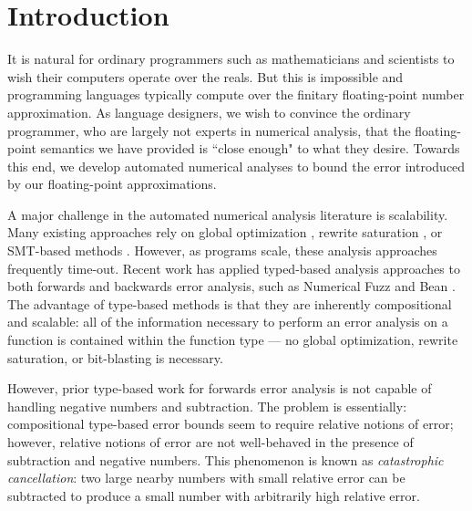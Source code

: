 \section{Introduction}
It is natural for ordinary programmers such as mathematicians and scientists to
wish their computers operate over the reals. 
But this is impossible and programming languages typically compute over the
finitary floating-point number approximation.
As language designers, we wish to convince the ordinary programmer, who are
largely not experts in numerical analysis, that the floating-point semantics we
have provided is ``close enough" to what they desire.
Towards this end, we develop automated numerical analyses to bound the error
introduced by our floating-point approximations.

A major challenge in the automated numerical analysis literature is scalability.
Many existing approaches rely on global optimization \cite{fptaylor} \cite{satire},
rewrite saturation \cite{gappa}, or SMT-based methods \cite{rosa}. 
However, as programs scale, these analysis approaches frequently time-out.
Recent work has applied typed-based analysis approaches to both forwards and
backwards error analysis, such as Numerical Fuzz \cite{numfuzz} and Bean \cite{bean}.
The advantage of type-based methods is that they are inherently compositional
and scalable: all of the information necessary to perform an error analysis on a
function is contained within the function type --- no global optimization,
rewrite saturation, or bit-blasting is necessary.

However, prior type-based work for forwards error analysis is not capable of
handling negative numbers and subtraction. The problem is essentially:
compositional type-based error bounds seem to require relative notions of error;
however, relative notions of error are not well-behaved in the presence of
subtraction and negative numbers. This phenomenon is known as
\textit{catastrophic cancellation}: two large nearby numbers with small relative
error can be subtracted to produce a small number with arbitrarily high relative
error.

